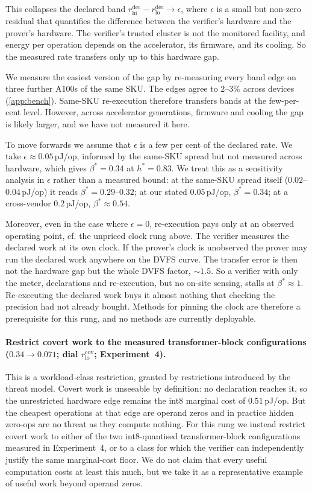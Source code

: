 \documentclass{article}
\theoremstyle{plain}
\theoremstyle{definition}
\theoremstyle{remark}
\begin{document}
This collapses the declared band $r_{\mathrm{hi}}^{\mathrm{dec}} - r_{\mathrm{lo}}^{\mathrm{dec}} \to \epsilon$, where $\epsilon$ is a small but non-zero residual that quantifies the difference between the verifier's hardware and the prover's hardware. The verifier's trusted cluster is not the monitored facility, and energy per operation depends on the accelerator, its firmware, and its cooling. So the measured rate transfers only up to this hardware gap.

We measure the easiest version of the gap by re-measuring every band edge on three further A100s of the same SKU. The edges agree to $2$--$3\%$ across devices (\cref{app:bench}).
Same-SKU re-execution therefore transfers bands at the few-per-cent level.  However, across accelerator generations, firmware and cooling the gap is likely larger, and we have not measured it here. 

To move forwards we assume that $\epsilon$ is a few per cent of the
declared rate. We take $\epsilon \approx 0.05$\,pJ/op, informed by the same-SKU
spread but not measured across hardware, which gives $\beta^{*} = 0.34$ at
$h^{*} = 0.83$. We treat this as a sensitivity analysis in $\epsilon$ rather than
a measured bound: at the same-SKU spread itself ($0.02$--$0.04$\,pJ/op) it
reads $\beta^{*} = 0.29$--$0.32$; at our stated $0.05$\,pJ/op, $\beta^{*} = 0.34$; at a cross-vendor
$0.2$\,pJ/op, $\beta^{*} {\approx}0.54$. 

Moreover, even in the case where $\epsilon=0$, re-execution pays only at an
observed operating point, cf. the unpriced clock rung above. The verifier
measures the declared work at its own clock. If the prover's clock is unobserved
the prover may run the declared work anywhere on the DVFS curve. The transfer error is then not
the hardware gap but the whole DVFS factor, ${\sim}1.5$. So a verifier with only the meter, declarations and re-execution, but
no on-site sensing, stalls at $\beta^{*} \approx 1$. Re-executing the
declared work buys it almost nothing that checking the precision had not
already bought. Methods for pinning the clock are therefore a prerequisite for this rung, and no methods are currently deployable.

\paragraph{Restrict covert work to the measured transformer-block configurations
($0.34 \to 0.071$; dial $r_{\mathrm{lo}}^{\mathrm{cov}}$; Experiment~4).}
This is a workload-class restriction, granted by restrictions introduced by the threat model.
Covert work is unseeable by definition: no declaration reaches it, so the
unrestricted hardware edge remains the int8 marginal cost of
$0.51$\,pJ/op.  But the cheapest operations at that edge are operand zeros and in practice hidden zero-ops are no
threat as they compute nothing.  For this rung we instead restrict covert work to either of the
two int8-quantised transformer-block configurations measured in Experiment~4,
or to a class for which the verifier can independently justify the same
marginal-cost floor. We do not claim that every useful computation costs at
least this much, but we take it as a representative example of useful work beyond operand zeros.
\end{document}

